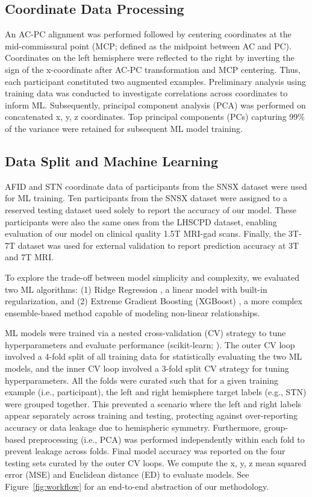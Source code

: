 \subsection{Coordinate Data Processing}
An AC-PC alignment was performed followed by centering coordinates at the mid-commissural point (MCP; defined as the midpoint between AC and PC). Coordinates on the left hemisphere were reflected to the right by inverting the sign of the x-coordinate after AC-PC transformation and MCP centering. Thus, each participant constituted two augmented examples. Preliminary analysis using training data was conducted to investigate correlations across coordinates to inform ML. Subsequently, principal component analysis (PCA) was performed on concatenated x, y, z coordinates. Top principal components (PCs) capturing 99\% of the variance were retained for subsequent ML model training.

\subsection{Data Split and Machine Learning}
AFID and STN coordinate data of participants from the SNSX dataset were used for ML training. Ten participants from the SNSX dataset were assigned to a reserved testing dataset used solely to report the accuracy of our model. These participants were also the same ones from the LHSCPD dataset, enabling evaluation of our model on clinical quality 1.5T MRI-gad scans. Finally, the 3T-7T dataset was used for external validation to report prediction accuracy at 3T and 7T MRI.

To explore the trade-off between model simplicity and complexity, we evaluated two ML algorithms: (1) Ridge Regression \cite{ref}, a linear model with built-in regularization, and (2) Extreme Gradient Boosting (XGBoost) \cite{ref}, a more complex ensemble-based method capable of modeling non-linear relationships.

ML models were trained via a nested cross-validation (CV) strategy to tune hyperparameters and evaluate performance (scikit-learn; \cite{pedregosa2012}). The outer CV loop involved a 4-fold split of all training data for statistically evaluating the two ML models, and the inner CV loop involved a 3-fold split CV strategy for tuning hyperparameters. All the folds were curated such that for a given training example (i.e., participant), the left and right hemisphere target labels (e.g., STN) were grouped together. This prevented a scenario where the left and right labels appear separately across training and testing, protecting against over-reporting accuracy or data leakage due to hemispheric symmetry. Furthermore, group-based preprocessing (i.e., PCA) was performed independently within each fold to prevent leakage across folds. Final model accuracy was reported on the four testing sets curated by the outer CV loops. We compute the x, y, z mean squared error (MSE) and Euclidean distance (ED) to evaluate models. See Figure~\ref{fig:workflow} for an end-to-end abstraction of our methodology.

